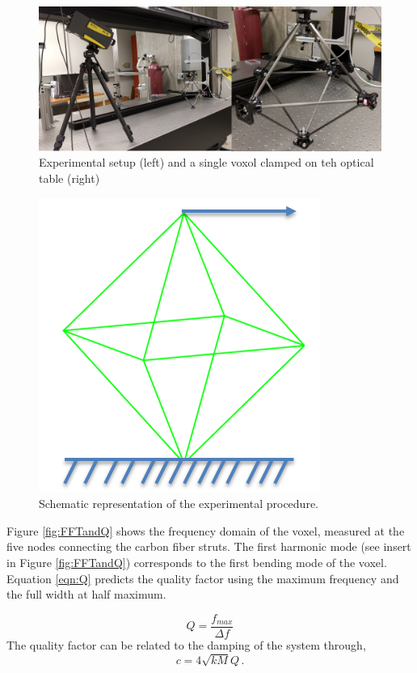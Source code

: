 \documentclass[11pt]{ucthesis}
\begin{document}
\begin{figure}[thpb]
\centering
\includegraphics[width=0.75\linewidth]{Figures/experimentalSetup.png}
\caption{Experimental setup (left) and a single voxol clamped on teh optical table (right)}
\label{fig:setUp}
\end{figure}

\begin{figure}[thpb]
\centering
\includegraphics[width=0.25\linewidth]{Figures/experimentalSetupDiagram.png}
\caption{Schematic representation of the experimental procedure. }
\label{fig:setUpD}
\end{figure}
Figure \ref{fig:FFTandQ} shows the frequency domain of the voxel, measured at the five nodes connecting the carbon fiber struts. The first harmonic mode (see insert in Figure \ref{fig:FFTandQ}) corresponds to the first bending mode of the voxel. Equation \ref{eqn:Q} predicts the quality factor using the maximum frequency and the full width at half maximum.

\begin{equation}
Q = \frac{f_{max}}{\Delta f}
\label{eqn:Q}
\end{equation}
The quality factor can be related to the damping of the system through,
\begin{equation}
c = 4 \sqrt{k M} Q \,.
\label{eqn:Q2c}
\end{equation}
\end{document}
